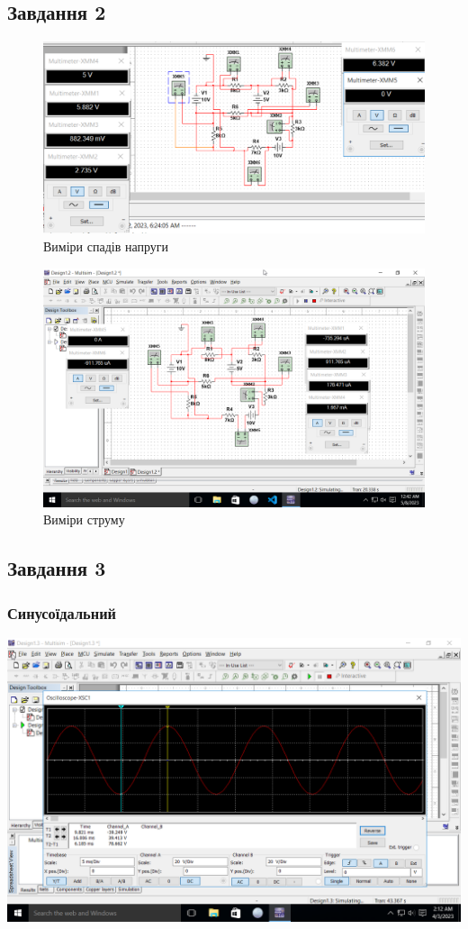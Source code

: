 \documentclass[a4paper, 12pt, oneside]{extarticle}
\begin{document}
\subsection*{Завдання 2}
\begin{figure}[h]
	\centering
	\includegraphics[width=.9\textwidth]{task2res}
	\caption{Виміри спадів напруги}
\end{figure}
\begin{figure}[h]
	\centering
	\includegraphics[width=.9\textwidth]{strum}
	\caption{Виміри струму}
\end{figure}

\begin{table}[h]
\end{table}

\subsection*{Завдання 3}
\subsubsection*{Синусоїдальний}
	\includegraphics[width=.9\textwidth]{sin}
\end{document}
